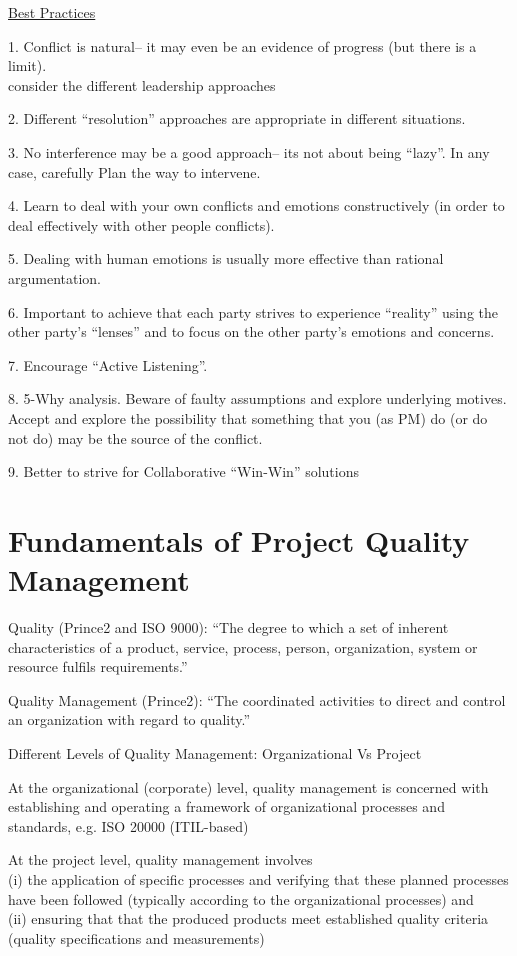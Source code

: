 \documentclass[]{project_plan}
\begin{document}
\underline{Best Practices}

1. Conflict is natural– it may even be an evidence of progress (but there is a limit).\\
consider the different leadership approaches

2. Different “resolution” approaches are appropriate in different situations.

3. No interference may be a good approach– its not about being “lazy”. In any case, carefully Plan the way
to intervene.

4. Learn to deal with your own conflicts and emotions constructively (in order to deal effectively with other
people conflicts).

5. Dealing with human emotions is usually more effective than rational argumentation.

6. Important to achieve that each party strives to experience “reality” using the other party’s “lenses” and
to focus on the other party’s emotions and concerns.

7. Encourage “Active Listening”.

8. 5-Why analysis. Beware of faulty assumptions and explore underlying motives. Accept and explore the
possibility that something that you (as PM) do (or do not do) may be the source of the conflict.

9. Better to strive for Collaborative “Win-Win” solutions

\chapter{Fundamentals of Project Quality Management}

Quality (Prince2 and ISO 9000): “The degree to which a set of inherent characteristics of a product,
service, process, person, organization, system or resource fulfils requirements.”

Quality Management (Prince2): “The coordinated activities to direct and control an organization
with regard to quality.”

Different Levels of Quality Management: Organizational Vs Project

At the organizational (corporate) level, quality management is concerned with establishing and
operating a framework of organizational processes and standards, e.g. ISO 20000 (ITIL-based)

At the project level, quality management involves\\
(i) the application of specific processes and verifying that these planned processes have been followed (typically according to the organizational processes) and\\
(ii) ensuring that that the produced products meet established quality criteria (quality specifications and measurements)
\end{document}
